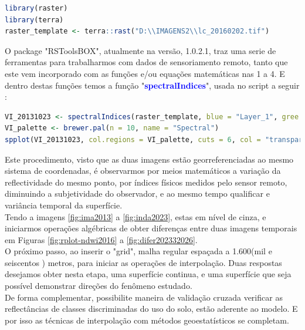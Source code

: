    \lstset{
 	language=R, %
 	caption=Código para carregar imagens   em linguagem R,} %
\begin{lstlisting}[language=R]
library(raster)
library(terra)
raster_template <- terra::rast("D:\\IMAGENS2\\lc_20160202.tif")	   
\end{lstlisting} 
 \hspace*{1.25 cm} O package "RSToolsBOX", atualmente na versão, 1.0.2.1, traz uma serie de ferramentas para trabalharmos com dados de sensoriamento remoto, tanto que este vem incorporado com as funções e/ou equações matemáticas nas 1 a 4. E dentro destas funções temos a função  "\textbf{\textcolor{blue}{spectralIndices}}", usada no script a seguir :
%
   \lstset{
	language=R, %
	caption=Código para obter índices  em linguagem R,} %
\begin{lstlisting}[language=R]
VI_20131023 <- spectralIndices(raster_template, blue = "Layer_1", gree = "Layer_2" ,red = "Layer_3", nir = "Layer_4",swir2 =  "Layer_5", indices = c("NDVI", "NDWI","EVI2", "MSAVI") 
VI_palette <- brewer.pal(n = 10, name = "Spectral")
spplot(VI_20131023, col.regions = VI_palette, cuts = 6, col = "transparente")
\end{lstlisting} 
%
 \hspace*{1.25 cm} Este procedimento, visto que as duas imagens estão georreferenciadas ao mesmo sistema  de coordenadas, é observarmos por meios matemáticos a variação da reflectividade do mesmo ponto, por índices físicos medidos pelo sensor remoto, diminuindo a subjetividade do observador, e ao mesmo tempo qualificar e variância temporal da superfície.\\
 \hspace*{1.25 cm} Tendo a imagens \ref{fig:ima2013} a  \ref{fig:inda2023}, estas em nível de cinza, e iniciarmos operações algébricas de obter diferenças entre duas imagens temporais em Figuras \ref{fig:rplot-ndwi2016} a \ref{fig:difer202332026}. \\
\hspace*{1.25 cm}  O próximo passo, ao inserir o "grid", malha regular espaçada a 1.600(mil e seiscentos ) metros, para iniciar as operações de interpolação. Duas respostas desejamos obter nesta etapa,  uma superfície continua, e uma superfície que seja possível demonstrar direções do fenômeno estudado. \\
% 
\hspace*{1.25 cm} De forma complementar, possibilite maneira de validação cruzada verificar as reflectâncias de classes discriminadas do uso do solo, estão aderente ao modelo. E por isso as técnicas de interpolação com métodos geoestatísticos se completam.\\
